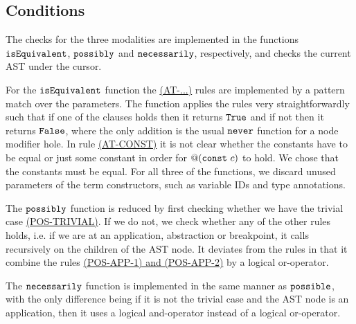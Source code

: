 \subsection{Conditions}
The checks for the three modalities are implemented in the functions
$\texttt{isEquivalent}$, $\texttt{possibly}$ and $\texttt{necessarily}$, respectively,
and checks the current AST under the cursor.

For the $\texttt{isEquivalent}$ function the
\hyperref[fig:conditionreductionrules]{(AT-...)} rules are implemented by a
pattern match over the parameters.
The function applies the rules very straightforwardly such that if one of the
clauses holds then it returns $\texttt{True}$ and if not then it returns
$\texttt{False}$, where the only addition is the usual $\texttt{never}$ function
for a node modifier hole. In rule
\hyperref[fig:conditionreductionrules]{(AT-CONST)} it is not clear whether the
constants have to be equal or just some constant in order for $@(\texttt{const}~c)$ to
hold. We chose that the constants must be equal.
For all three of the functions, we discard unused parameters of the term
constructors, such as variable IDs and type annotations.

The $\texttt{possibly}$ function is reduced by first checking whether we have the
trivial case \hyperref[fig:conditionreductionrules]{(POS-TRIVIAL)}. If we do
not, we check whether any of the other rules holds, i.e. if we are at an
application, abstraction or breakpoint, it calls recursively on the children of
the AST node. It deviates from the rules in that it combine the rules
\hyperref[fig:conditionreductionrules]{(POS-APP-1) and (POS-APP-2)} by a logical
or-operator.

The $\texttt{necessarily}$ function is implemented in the same manner as
$\texttt{possible}$, with the only difference being if it is not the trivial case
and the AST node is an application, then it uses a logical and-operator instead
of a logical or-operator.
